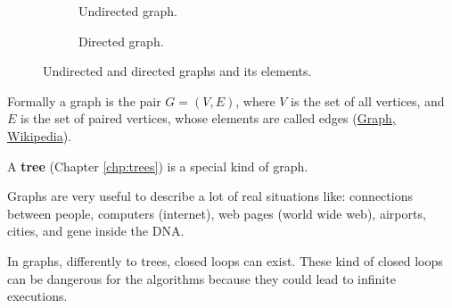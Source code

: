 \begin{figure}[H]
\centering
\begin{subfigure}[b]{0.4\linewidth}
\centering
{}
	\caption{Undirected graph.}
\end{subfigure}
\hspace{1em}
\begin{subfigure}[b]{0.4\linewidth}
\centering
{}
	\caption{Directed graph.}
\end{subfigure}
\caption[Undirected and directed graphs and its elements.]{Undirected and directed graphs and its elements.}
\end{figure}


Formally a graph is the pair \(G=(V, E)\), where \(V\) is the set of all vertices, and \(E\) is the set of paired vertices, whose elements are called edges \cite{wikigraphmath} (\href{https://en.wikipedia.org/wiki/Graph_(discrete_mathematics)}{Graph, Wikipedia}).

A \textbf{tree} (Chapter \ref{chp:trees}) is a special kind of graph.

Graphs are very useful to describe a lot of real situations like: connections between people, computers (internet), web pages (world wide web), airports, cities, and gene inside the DNA.

In graphs, differently to trees, closed loops can exist. These kind of closed loops can be dangerous for the algorithms because they could lead to infinite executions.

